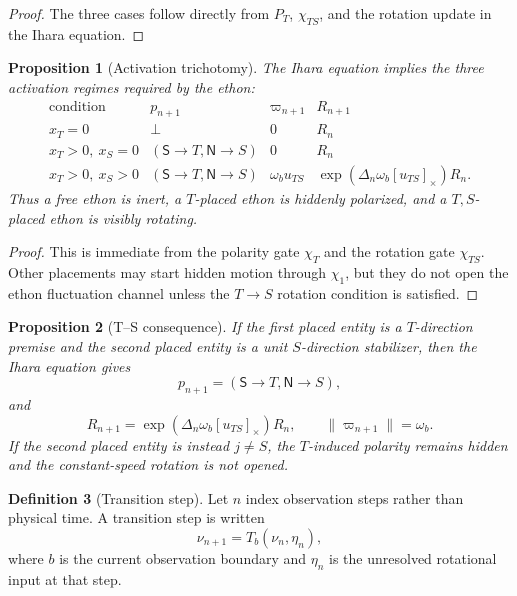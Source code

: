 \documentclass[11pt]{article}
\theoremstyle{definition}
\newtheorem{definition}{Definition}[section]
\theoremstyle{plain}
\newtheorem{proposition}[definition]{Proposition}
\newcommand{\Npole}{\mathsf N}
\newcommand{\Spole}{\mathsf S}
\begin{document}
\begin{proof}
The three cases follow directly from \(P_T\), \(\chi_{TS}\), and the
rotation update in the Ihara equation.
\end{proof}

\begin{proposition}[Activation trichotomy]
The Ihara equation implies the three activation regimes required by the
ethon:
\[
\begin{array}{c|c|c|c}
\text{condition} & p_{n+1} & \varpi_{n+1} & R_{n+1}\\
\hline
x_T=0 & \bot & 0 & R_n\\
x_T>0,\ x_S=0 & (\Spole\to T,\Npole\to S) & 0 & R_n\\
x_T>0,\ x_S>0 & (\Spole\to T,\Npole\to S)
  & \omega_bu_{TS}
  & \exp(\Delta_n\omega_b[u_{TS}]_\times)R_n.
\end{array}
\]
Thus a free ethon is inert, a \(T\)-placed ethon is hiddenly polarized,
and a \(T,S\)-placed ethon is visibly rotating.
\end{proposition}

\begin{proof}
This is immediate from the polarity gate \(\chi_T\) and the rotation gate
\(\chi_{TS}\).  Other placements may start hidden motion through
\(\chi_1\), but they do not open the ethon fluctuation channel unless the
\(T\to S\) rotation condition is satisfied.
\end{proof}

\begin{proposition}[T--S consequence]
If the first placed entity is a \(T\)-direction premise and the second
placed entity is a unit \(S\)-direction stabilizer, then the Ihara
equation gives
\[
  p_{n+1}
  =
  (\Spole\to T,\Npole\to S),
\]
and
\[
  R_{n+1}
  =
  \exp(\Delta_n\omega_b[u_{TS}]_\times)R_n,
  \qquad
  \|\varpi_{n+1}\|=\omega_b.
\]
If the second placed entity is instead \(j\neq S\), the \(T\)-induced
polarity remains hidden and the constant-speed rotation is not opened.
\end{proposition}

\begin{definition}[Transition step]
Let \(n\) index observation steps rather than physical time.  A transition
step is written
\[
  \nu_{n+1}
  =
  T_b(\nu_n,\eta_n),
\]
where \(b\) is the current observation boundary and \(\eta_n\) is the
unresolved rotational input at that step.
\end{definition}
\end{document}
